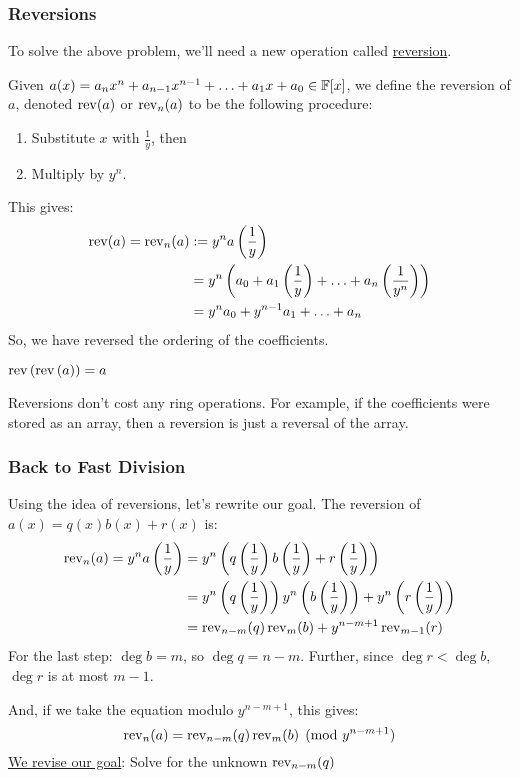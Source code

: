 \subsubsection{Reversions}
To solve the above problem, we'll need a new operation called \ul{reversion}. 

Given $a(x) = a_nx^n + a_{n-1}x^{n-1} + \ldots + a_1x + a_0 \in \operatorname{\mathbb{F}}[x]$, we define the reversion of $a$, denoted $\operatorname{rev}(a)$ or $\operatorname{rev}_n(a)$ to be the following procedure:
\begin{enumerate}
    \item Substitute $x$ with $\frac{1}{y}$, then
    \item Multiply by $y^n$.
\end{enumerate} 
This gives:
\begin{equation}
    \begin{aligned}
        \operatorname{rev}(a) = \operatorname{rev}_n(a) &:= y^na\left(\frac{1}{y}\right) \\
        &= y^n\left(a_0 + a_1\left(\frac{1}{y}\right) + \ldots + a_n\left(\frac{1}{y^n}\right)\right) \\
        &= y^na_0 + y^{n-1}a_1 + \ldots + a_n
    \end{aligned}
\end{equation}
So, we have reversed the ordering of the coefficients.

\begin{remark}
    $\operatorname{rev}\left(\operatorname{rev}\left(a\right)\right) = a$
\end{remark}

\begin{note}
    Reversions don't cost any ring operations. For example, if the coefficients were stored as an array, then a reversion is just a reversal of the array. 
\end{note}

\subsubsection{Back to Fast Division}
Using the idea of reversions, let's rewrite our goal.
The reversion of $a(x) = q(x)b(x) + r(x)$ is:
\begin{align*}
    \operatorname{rev}_n(a) = y^na\left(\frac{1}{y}\right) &= y^n\left(q\left(\frac{1}{y}\right)b\left(\frac{1}{y}\right) + r\left(\frac{1}{y}\right)\right) \\
    &= y^n\left(q\left(\frac{1}{y}\right)\right)
    y^n\left(b\left(\frac{1}{y}\right)\right) + 
    y^n\left(r\left(\frac{1}{y}\right)\right) \\
    &= \operatorname{rev}_{n-m}(q)\operatorname{rev}_m(b) + y^{n-m+1}\operatorname{rev}_{m-1}(r)
\end{align*}
For the last step: $\deg b = m$, so $\deg q = n - m$.
Further, since $\deg r < \deg b$, $\deg r$ is at most $m-1$.

And, if we take the equation modulo $y^{n - m + 1}$, this gives:
\begin{equation}\label{eq:lec7-fast-division-new-goal}
    \operatorname{rev}_n(a) = \operatorname{rev}_{n-m}(q)\operatorname{rev}_m(b) \pmod{y^{n-m+1}}
\end{equation}
\ul{We revise our goal}: Solve  for the unknown $\operatorname{rev}_{n-m}(q)$

